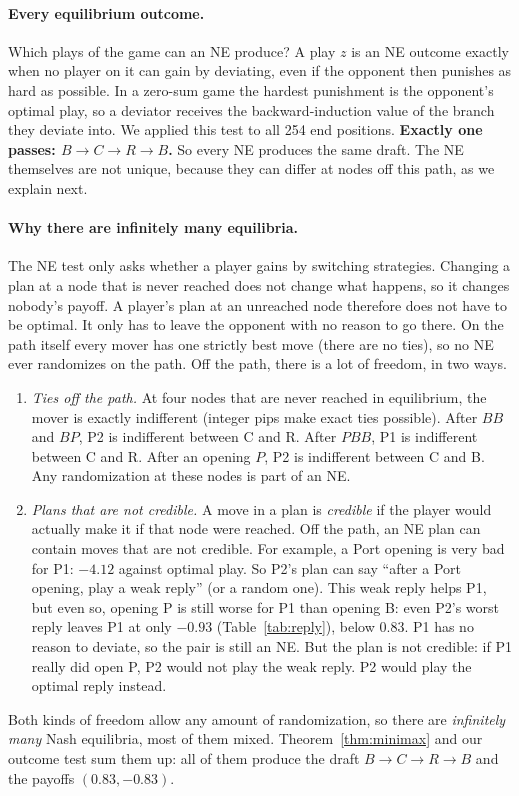 \documentclass[11pt]{article}
\begin{document}
\paragraph{Every equilibrium outcome.} Which plays of the game can an NE produce? A play $z$ is an NE outcome exactly when no player on it can gain by deviating, even if the opponent then punishes as hard as possible. In a zero-sum game the hardest punishment is the opponent's optimal play, so a deviator receives the backward-induction value of the branch they deviate into. We applied this test to all 254 end positions. \textbf{Exactly one passes: $B\to C\to R\to B$.} So every NE produces the same draft. The NE themselves are not unique, because they can differ at nodes off this path, as we explain next.

\paragraph{Why there are infinitely many equilibria.} The NE test only asks whether a player gains by switching strategies. Changing a plan at a node that is never reached does not change what happens, so it changes nobody's payoff. A player's plan at an unreached node therefore does not have to be optimal. It only has to leave the opponent with no reason to go there. On the path itself every mover has one strictly best move (there are no ties), so no NE ever randomizes on the path. Off the path, there is a lot of freedom, in two ways.
\begin{enumerate}
\item \emph{Ties off the path.} At four nodes that are never reached in equilibrium, the mover is exactly indifferent (integer pips make exact ties possible). After $BB$ and $BP$, P2 is indifferent between C and R. After $PBB$, P1 is indifferent between C and R. After an opening $P$, P2 is indifferent between C and B. Any randomization at these nodes is part of an NE.
\item \emph{Plans that are not credible.} A move in a plan is \emph{credible} if the player would actually make it if that node were reached. Off the path, an NE plan can contain moves that are not credible. For example, a Port opening is very bad for P1: $-4.12$ against optimal play. So P2's plan can say ``after a Port opening, play a weak reply'' (or a random one). This weak reply helps P1, but even so, opening P is still worse for P1 than opening B: even P2's worst reply leaves P1 at only $-0.93$ (Table~\ref{tab:reply}), below $0.83$. P1 has no reason to deviate, so the pair is still an NE. But the plan is not credible: if P1 really did open P, P2 would not play the weak reply. P2 would play the optimal reply instead.
\end{enumerate}
Both kinds of freedom allow any amount of randomization, so there are \emph{infinitely many} Nash equilibria, most of them mixed. Theorem~\ref{thm:minimax} and our outcome test sum them up: all of them produce the draft $B\to C\to R\to B$ and the payoffs $(0.83,-0.83)$.
\end{document}
